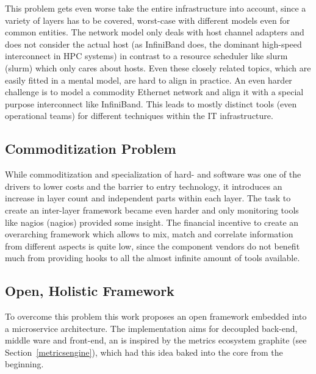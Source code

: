 This problem gets even worse take the entire infrastructure into account, since a variety of layers has to be covered, worst-case with different models even for common entities.
The network model only deals with host channel adapters and does not consider the actual host (as InfiniBand does, the dominant high-speed interconnect in HPC systems) in contrast to a resource
scheduler like \gls{slurm} (\glsdesc{slurm}) which only cares about hosts. Even these closely related topics, which are easily fitted
in a mental model, are hard to align in practice. An even harder challenge is to model a commodity Ethernet network and align it with a special purpose interconnect like InfiniBand.
This leads to mostly distinct tools (even operational teams) for different techniques within the IT infrastructure.

\subsection{Commoditization Problem}
While commoditization and specialization of hard- and software was one of the drivers to lower costs and the barrier to entry technology, it
introduces an increase in layer count and
independent parts within each layer. The task to create an inter-layer framework became even harder and only monitoring tools like \gls{nagios} (\glsdesc{nagios}) provided some insight.
The financial incentive to create an overarching framework which allows to mix, match and correlate information from different aspects is quite low, since the component vendors
do not benefit much from providing hooks to all the almost infinite amount of tools available.

\subsection{Open, Holistic Framework}
To overcome this problem this work proposes an open framework embedded into a microservice architecture. The implementation aims for decoupled back-end, middle ware and front-end,
an is inspired by the metrics ecosystem \gls{graphite} (see Section~\ref{metricsengine}), which had this idea baked into the core from the beginning.

